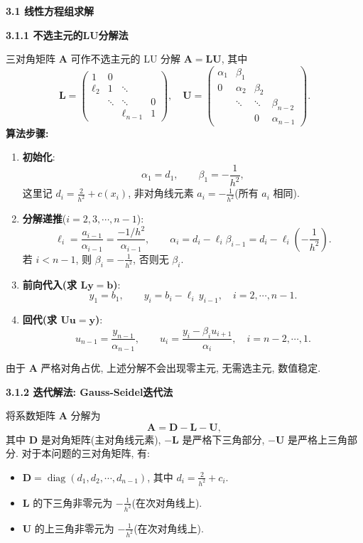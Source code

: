 \documentclass[zihao=-4,a4paper]{ctexart}
\begin{document}
\noindent\textbf{3.1 线性方程组求解}

\noindent\textbf{3.1.1 不选主元的LU分解法}

三对角矩阵 $\bm{A}$ 可作不选主元的 LU 分解 $\bm{A} = \bm{LU}$, 其中  
\[
\bm{L} = \begin{pmatrix}
1 & 0 & & \\
\ell_2 & 1 & \ddots & \\
& \ddots & \ddots & 0 \\
& & \ell_{n-1} & 1
\end{pmatrix},\quad
\bm{U} = \begin{pmatrix}
\alpha_1 & \beta_1 & & \\
0 & \alpha_2 & \beta_2 & \\
& \ddots & \ddots & \beta_{n-2} \\
& & 0 & \alpha_{n-1}
\end{pmatrix}.
\]
\noindent \textbf{算法步骤: }
\begin{enumerate}
    \item \textbf{初始化}:  
    \[
    \alpha_1 = d_1,\qquad \beta_1 = -\frac{1}{h^2},
    \]  
    这里记 $d_i = \frac{2}{h^2}+c(x_i)$, 非对角线元素 $a_i = -\frac{1}{h^2}$(所有 $a_i$ 相同). 

    \item \textbf{分解递推}($i=2,3,\cdots,n-1$):  
    \[
    \ell_i = \frac{a_{i-1}}{\alpha_{i-1}} = \frac{-1/h^2}{\alpha_{i-1}},
    \qquad
    \alpha_i = d_i - \ell_i \beta_{i-1} = d_i - \ell_i\left(-\frac{1}{h^2}\right).
    \]  
    若 $i<n-1$, 则 $\beta_i = -\frac{1}{h^2}$, 否则无 $\beta_i$. 

    \item \textbf{前向代入(求 $\bm{Ly}=\bm{b}$)}:
    \[
    y_1 = b_1,
    \qquad
    y_i = b_i - \ell_i\, y_{i-1},\quad i=2,\cdots,n-1.
    \]

    \item \textbf{回代(求 $\bm{Uu}=\bm{y}$)}:  
    \[
    u_{n-1} = \frac{y_{n-1}}{\alpha_{n-1}},
    \qquad
    u_i = \frac{y_i - \beta_i u_{i+1}}{\alpha_i},\quad i=n-2,\cdots,1.
    \]
\end{enumerate}
由于 $\bm{A}$ 严格对角占优, 上述分解不会出现零主元, 无需选主元, 数值稳定. 

\vspace*{1em}
\noindent\textbf{3.1.2 迭代解法: Gauss-Seidel迭代法}

将系数矩阵 $\bm{A}$ 分解为
\[
\bm{A} = \bm{D} - \bm{L} - \bm{U},
\]
其中 $\bm{D}$ 是对角矩阵(主对角线元素), $-\bm{L}$ 是严格下三角部分, $-\bm{U}$ 是严格上三角部分. 对于本问题的三对角矩阵, 有: 
\begin{itemize}
    \item $\bm{D} = \operatorname{diag}(d_1, d_2, \cdots, d_{n-1})$, 其中 $d_i = \frac{2}{h^2}+c_i$. 
    \item $\bm{L}$ 的下三角非零元为 $-\frac{1}{h^2}$(在次对角线上). 
    \item $\bm{U}$ 的上三角非零元为 $-\frac{1}{h^2}$(在次对角线上). 
\end{itemize}
\end{document}
